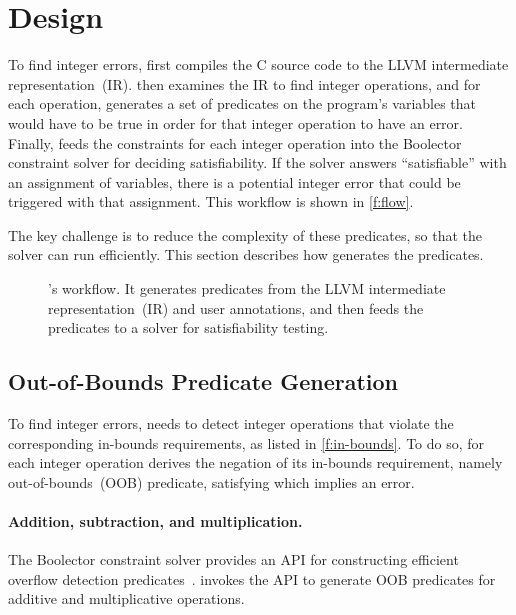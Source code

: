 \section{Design}
\label{s:gen}

To find integer errors, \sys first compiles the C source code to the
LLVM intermediate representation~(IR).  \sys then examines the IR to
find integer operations, and for each operation, \sys generates a
set of predicates on the program's variables that would have to be
true in order for that integer operation to have an error.  Finally,
\sys feeds the constraints for each integer operation into the
Boolector constraint solver for deciding satisfiability.  If the
solver answers ``satisfiable'' with an assignment of variables,
there is a potential integer error that could be triggered with
that assignment.  This workflow is shown in \autoref{f:flow}.

The key challenge is to reduce the complexity of these predicates,
so that the solver can run efficiently.  This section describes how
\sys generates the predicates.

\begin{figure}
\centering
\resizebox{\linewidth}{!}{

}
\caption{\sys's workflow.  It generates predicates from the LLVM
intermediate representation~(IR) and user annotations, and then feeds
the predicates to a solver for satisfiability testing.}
\label{f:flow}
\end{figure}

\subsection{Out-of-Bounds Predicate Generation}
\label{s:gen:oob}

To find integer errors, \sys needs to detect integer operations
that violate the corresponding in-bounds requirements, as listed
in \autoref{f:in-bounds}.  To do so, for each integer operation
\sys derives the negation of its in-bounds requirement, namely
out-of-bounds~(OOB) predicate, satisfying which implies an error.

\paragraph{Addition, subtraction, and multiplication.}
The Boolector constraint solver provides an API for constructing
efficient overflow detection
predicates~\cite[\subsectionautorefname~3.5]{brummayer:phd}.
\sys invokes the API to generate OOB predicates for additive and
multiplicative operations.

